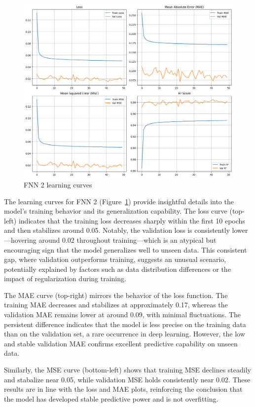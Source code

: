 \begin{figure}[H]
    \centering
    \includegraphics[width=1\linewidth]{images/fnn1-lc.png}
    \caption{FNN 2 learning curves}
    \label{fig:fnn2_learning_curves}
\end{figure}

The learning curves for FNN 2 (Figure~\ref{fig:fnn2_learning_curves}) provide insightful details into the model’s training behavior and its generalization capability. The loss curve (top-left) indicates that the training loss decreases sharply within the first 10 epochs and then stabilizes around 0.05. Notably, the validation loss is consistently lower—hovering around 0.02 throughout training—which is an atypical but encouraging sign that the model generalizes well to unseen data. This consistent gap, where validation outperforms training, suggests an unusual scenario, potentially explained by factors such as data distribution differences or the impact of regularization during training.

The MAE curve (top-right) mirrors the behavior of the loss function. The training MAE decreases and stabilizes at approximately 0.17, whereas the validation MAE remains lower at around 0.09, with minimal fluctuations. The persistent difference indicates that the model is less precise on the training data than on the validation set, a rare occurrence in deep learning. However, the low and stable validation MAE confirms excellent predictive capability on unseen data.

Similarly, the MSE curve (bottom-left) shows that training MSE declines steadily and stabalize near 0.05, while validation MSE holds consistently near 0.02. These results are in line with the loss and MAE plots, reinforcing the conclusion that the model has developed stable predictive power and is not overfitting.

